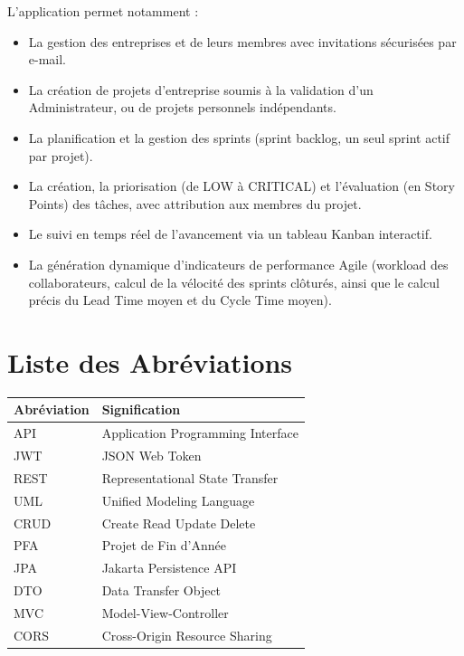 \documentclass[12pt,a4paper]{report}
\begin{document}
L'application permet notamment :
\begin{itemize}
\item La gestion des entreprises et de leurs membres avec invitations sécurisées par e-mail.
\item La création de projets d'entreprise soumis à la validation d'un Administrateur, ou de projets personnels indépendants.
\item La planification et la gestion des sprints (sprint backlog, un seul sprint actif par projet).
\item La création, la priorisation (de LOW à CRITICAL) et l'évaluation (en Story Points) des tâches, avec attribution aux membres du projet.
\item Le suivi en temps réel de l'avancement via un tableau Kanban interactif.
\item La génération dynamique d'indicateurs de performance Agile (workload des collaborateurs, calcul de la vélocité des sprints clôturés, ainsi que le calcul précis du Lead Time moyen et du Cycle Time moyen).
\end{itemize}


\chapter*{Liste des Abréviations}

\begin{longtable}{|p{3cm}|p{11cm}|}
\hline
\textbf{Abréviation} & \textbf{Signification} \\ \hline
API & Application Programming Interface \\ \hline
JWT & JSON Web Token \\ \hline
REST & Representational State Transfer \\ \hline
UML & Unified Modeling Language \\ \hline
CRUD & Create Read Update Delete \\ \hline
PFA & Projet de Fin d'Année \\ \hline
JPA & Jakarta Persistence API \\ \hline
DTO & Data Transfer Object \\ \hline
MVC & Model-View-Controller \\ \hline
CORS & Cross-Origin Resource Sharing \\ \hline
\end{longtable}
\end{document}
